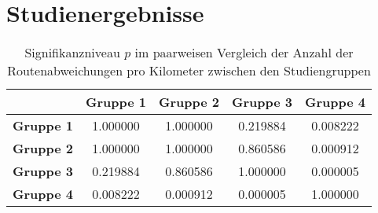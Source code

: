 \appendix

\section{Studienergebnisse}
\label{sec:appendix_study_results}

\begin{table}
    \begin{center}
        \begin{tabular}{|c|c|c|c|c|}
            \hline
            & \textbf{Gruppe 1} & \textbf{Gruppe 2} & \textbf{Gruppe 3} & \textbf{Gruppe 4} \\ \hline
            \textbf{Gruppe 1}   & 1.000000 & 1.000000 & 0.219884 & 0.008222 \\ \hline
            \textbf{Gruppe 2}   & 1.000000 & 1.000000 & 0.860586 & 0.000912 \\ \hline
            \textbf{Gruppe 3}   & 0.219884 & 0.860586 & 1.000000 & 0.000005 \\ \hline
            \textbf{Gruppe 4}   & 0.008222 & 0.000912 & 0.000005 & 1.000000 \\ \hline
        \end{tabular}
    \end{center}
    
    \caption{Signifikanzniveau $ p $ im paarweisen Vergleich der Anzahl der Routenabweichungen pro Kilometer zwischen den Studiengruppen }
    \label{tab:study_offroute_significance_results}
\end{table}